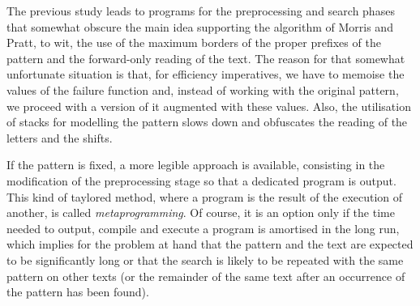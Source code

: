 \vspace*{-10pt}


The previous study leads to programs for the preprocessing and search
phases that somewhat obscure the main idea supporting the algorithm of
Morris and Pratt, to wit, the use of the maximum borders of the proper
prefixes of the pattern and the forward\hyp{}only reading of the
text. The reason for that somewhat unfortunate situation is that, for
efficiency imperatives, we have to memoise the
values of the failure function and, instead of working with the
original pattern, we proceed with a version of it augmented with these
values. Also, the utilisation of stacks for modelling the pattern
slows down and obfuscates the reading of the letters and the shifts.

If the pattern is fixed, a more legible approach is available,
consisting in the modification of the preprocessing stage so that a
dedicated program is output. This kind of taylored method, where a
program is the result of the execution of another, is called
\emph{metaprogramming}. Of course, it is an
option only if the time needed to output, compile and execute a
program is amortised in the long run, which implies for the problem at
hand that the pattern and the text are expected to be significantly
long or that the search is likely to be repeated with the same pattern
on other texts (or the remainder of the same text after an occurrence
of the pattern has been found).

